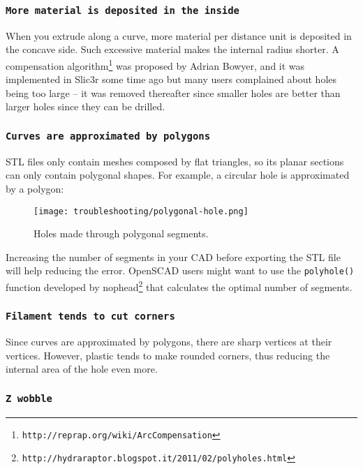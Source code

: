 \subsubsection{\texttt{More material is deposited in the inside}}

When you extrude along a curve, more material per distance unit is deposited in the concave side. Such excessive material makes the internal radius shorter. A compensation algorithm\footnote{\texttt{http://reprap.org/wiki/ArcCompensation}} was proposed by Adrian Bowyer, and it was implemented in Slic3r some time ago but many users complained about holes being too large – it was removed thereafter since smaller holes are better than larger holes since they can be drilled.

\subsubsection{\texttt{Curves are approximated by polygons}}

STL files only contain meshes composed by flat triangles, so its planar sections can only contain polygonal shapes. For example, a circular hole is approximated by a polygon:

\begin{figure}[H]
\centering
\texttt{[image: troubleshooting/polygonal-hole.png]}
\caption{Holes made through polygonal segments.}
\label{fig:polygonal-hole}
\end{figure}

Increasing the number of segments in your CAD before exporting the STL file will help reducing the error. OpenSCAD users might want to use the \texttt{polyhole()} function developed by nophead\footnote{\texttt{http://hydraraptor.blogspot.it/2011/02/polyholes.html}} that calculates the optimal number of segments.

\subsubsection{\texttt{Filament tends to cut corners}}

Since curves are approximated by polygons, there are sharp vertices at their vertices. However, plastic tends to make rounded corners, thus reducing the internal area of the hole even more.

\subsubsection{\texttt{Z wobble}}

